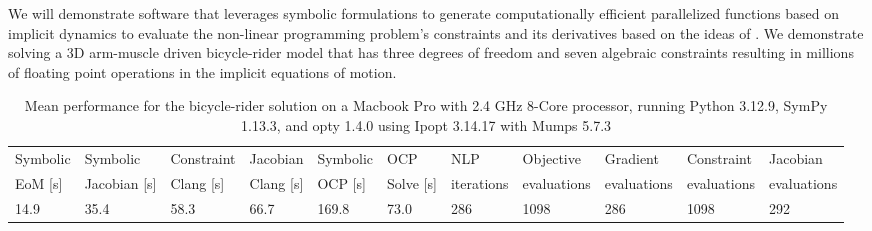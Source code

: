 \documentclass[11pt,twocolumn]{article}
\begin{document}
We will demonstrate software that leverages symbolic formulations to generate
computationally efficient parallelized functions based on implicit dynamics to
evaluate the non-linear programming problem's constraints and its derivatives
based on the ideas of \cite{vandenBogert2011a}. We demonstrate solving a 3D
arm-muscle driven bicycle-rider model that has three degrees of freedom and
seven algebraic constraints resulting in millions of floating point operations
in the implicit equations of motion.
%
\begin{table}[t]
  \centering
  \caption{Mean performance for the bicycle-rider solution on a Macbook Pro
    with 2.4 GHz 8-Core processor, running Python 3.12.9, SymPy 1.13.3, and
    opty 1.4.0 using Ipopt 3.14.17 with Mumps 5.7.3}
  \scriptsize
  \begin{tabular}{lllllllllll}
    \toprule
    Symbolic &
    Symbolic &
    Constraint &
    Jacobian &
    Symbolic &
    OCP &
    NLP &
    Objective &
    Gradient &
    Constraint &
    Jacobian
    \\
    EoM [s] &
    Jacobian [s] &
    Clang [s] &
    Clang [s] &
    OCP [s] &
    Solve [s] &
    iterations &
    evaluations &
    evaluations &
    evaluations &
    evaluations
    \\
    \midrule
    14.9 &
    35.4 &
    58.3 &
    66.7 &
    169.8 &
    73.0 &
    286 &
    1098 &
    286 &
    1098 &
    292
    \\
    \bottomrule
  \end{tabular}
  \label{tab:performance}
\end{table}

\vspace{-1em}
\end{document}
